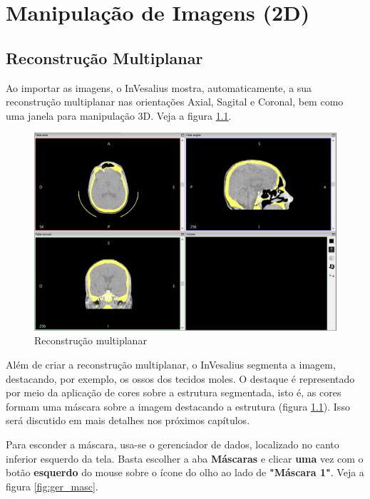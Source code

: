 \chapter{Manipulação de Imagens (2D)}

\section{Reconstrução Multiplanar}

Ao importar as imagens, o InVesalius mostra, automaticamente, a sua reconstrução
multiplanar nas orientações Axial, Sagital e Coronal, bem como uma janela para manipulação 3D.
Veja a figura \ref{fig:mpr}.

\begin{figure}[!htb]
\centering
\includegraphics[scale=0.30]{../user_guide_figures/invesalius_screen/multiplanar_mask_window_pt.png}
\caption{Reconstrução multiplanar}
\label{fig:mpr}
\end{figure}

\newpage

Além de criar a reconstrução multiplanar, o InVesalius segmenta a imagem, destacando, por exemplo, os
ossos dos tecidos moles. O destaque é representado por meio da aplicação de cores sobre a estrutura
segmentada, isto é, as cores formam uma máscara sobre a imagem destacando a estrutura (figura
\ref{fig:mpr}). Isso será discutido em mais detalhes nos próximos capítulos.

Para esconder a máscara, usa-se o gerenciador de dados, localizado no canto inferior esquerdo
da tela. Basta escolher a aba \textbf{Máscaras} e clicar \textbf{uma} vez com o botão
\textbf{esquerdo} do mouse sobre o ícone do olho ao lado de \textbf{"Máscara 1"}. Veja a figura
\ref{fig:ger_masc}.

